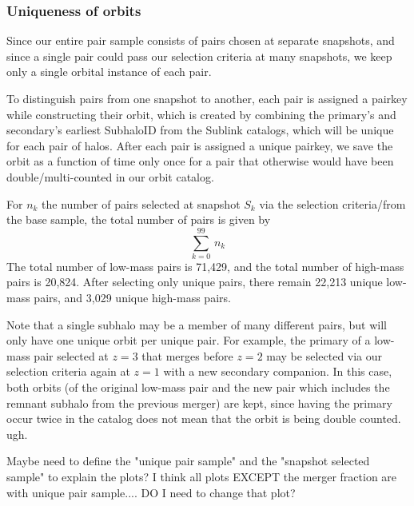 \documentclass[twocolumn,linenumbers]{aastex631}
\begin{document}
\subsubsection{Uniqueness of orbits}
Since our entire pair sample consists of pairs chosen at separate snapshots, and since a single pair could pass our selection criteria at many snapshots, we keep only a single orbital instance of each pair. 

To distinguish pairs from one snapshot to another, each pair is assigned a pairkey while constructing their orbit, which is created by combining the primary's and secondary's earliest SubhaloID from the Sublink catalogs, which will be unique for each pair of halos. 
After each pair is assigned a unique pairkey, we save the orbit as a function of time only once for a pair that otherwise would have been double/multi-counted in our orbit catalog.

For $n_k$ the number of pairs selected at snapshot $S_k$ via the selection criteria/from the base sample, the total number of pairs is given by
\begin{equation*}
    \sum_{k=0}^{99}\, n_k
\end{equation*}
The total number of low-mass pairs is 71,429, and the total number of high-mass pairs is 20,824.
After selecting only unique pairs, there remain 22,213 unique low-mass pairs, and 3,029 unique high-mass pairs.

Note that a single subhalo may be a member of many different pairs, but will only have one unique orbit per unique pair.
For example, the primary of a low-mass pair selected at $z=3$ that merges before $z=2$ may be selected via our selection criteria again at $z=1$ with a new secondary companion. 
In this case, both orbits (of the original low-mass pair and the new pair which includes the remnant subhalo from the previous merger) are kept, since having the primary occur twice in the catalog does not mean that the orbit is being double counted. ugh. 


Maybe need to define the "unique pair sample" and the "snapshot selected sample" to explain the plots? I think all plots EXCEPT the merger fraction are with unique pair sample.... DO I need to change that plot? 

\end{document}
